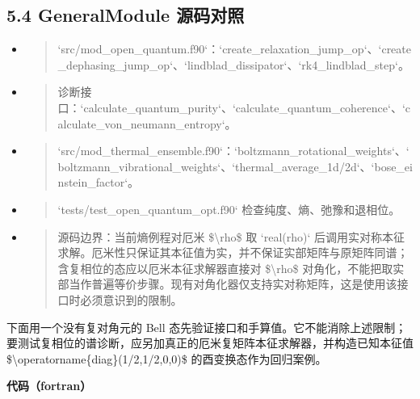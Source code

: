 \documentclass[UTF8,openany,11pt,fontset=fandol]{ctexbook}
\begin{document}
\subsection{\texorpdfstring{\textbf{5.4 GeneralModule
源码对照}}{5.4 GeneralModule 源码对照}}\label{generalmodule-ux6e90ux7801ux5bf9ux7167-4}

\begin{itemize}
\item
  \begin{quote}
  `src/mod\_open\_quantum.f90`：`create\_relaxation\_jump\_op`、`create\_dephasing\_jump\_op`、`lindblad\_dissipator`、`rk4\_lindblad\_step`。
  \end{quote}
\item
  \begin{quote}
  诊断接口：`calculate\_quantum\_purity`、`calculate\_quantum\_coherence`、`calculate\_von\_neumann\_entropy`。
  \end{quote}
\item
  \begin{quote}
  `src/mod\_thermal\_ensemble.f90`：`boltzmann\_rotational\_weights`、`boltzmann\_vibrational\_weights`、`thermal\_average\_1d/2d`、`bose\_einstein\_factor`。
  \end{quote}
\item
  \begin{quote}
  `tests/test\_open\_quantum\_opt.f90` 检查纯度、熵、弛豫和退相位。
  \end{quote}
\item
  \begin{quote}
  源码边界：当前熵例程对厄米 \$\textbackslash rho\$ 取 `real(rho)`
  后调用实对称本征求解。厄米性只保证其本征值为实，并不保证实部矩阵与原矩阵同谱；含复相位的态应以厄米本征求解器直接对
  \$\textbackslash rho\$
  对角化，不能把取实部当作普遍等价步骤。现有对角化器仅支持实对称矩阵，这是使用该接口时必须意识到的限制。
  \end{quote}
\end{itemize}

下面用一个没有复对角元的 Bell
态先验证接口和手算值。它不能消除上述限制；要测试复相位的谱诊断，应另加真正的厄米复矩阵本征求解器，并构造已知本征值
\$\textbackslash operatorname\{diag\}(1/2,1/2,0,0)\$
的酉变换态作为回归案例。

\textbf{代码（fortran）}
\end{document}
